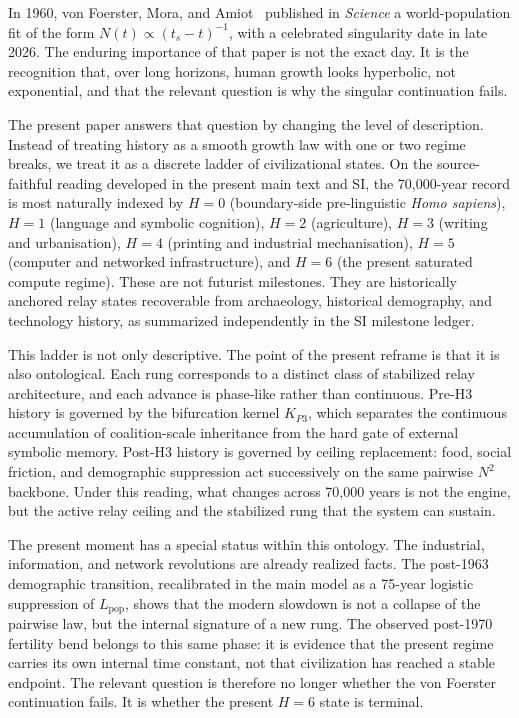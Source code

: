\documentclass[11pt]{article}
\begin{document}
In 1960, von Foerster, Mora, and Amiot~\cite{vonfoerster1960}
published in \textit{Science}
a world-population fit of the form
\(N(t) \propto (t_s-t)^{-1}\),
with a celebrated singularity date in late 2026.
The enduring importance of that paper is not the exact day.
It is the recognition that, over long horizons,
human growth looks hyperbolic,
not exponential,
and that the relevant question is why the singular continuation fails.

The present paper answers that question by changing the level of description.
Instead of treating history as a smooth growth law with one or two regime breaks,
we treat it as a discrete ladder of civilizational states.
On the source-faithful reading developed in the present main text and SI,
the 70,000-year record is most naturally indexed by
\(H=0\) (boundary-side pre-linguistic \emph{Homo sapiens}),
\(H=1\) (language and symbolic cognition),
\(H=2\) (agriculture),
\(H=3\) (writing and urbanisation),
\(H=4\) (printing and industrial mechanisation),
\(H=5\) (computer and networked infrastructure),
and \(H=6\) (the present saturated compute regime).
These are not futurist milestones.
They are historically anchored relay states recoverable from archaeology,
historical demography,
and technology history,
as summarized independently in the SI milestone ledger.

This ladder is not only descriptive.
The point of the present reframe is that it is also ontological.
Each rung corresponds to a distinct class of stabilized relay architecture,
and each advance is phase-like rather than continuous.
Pre-H3 history is governed by the bifurcation kernel
\(K_{P3}\),
which separates the continuous accumulation of coalition-scale inheritance
from the hard gate of external symbolic memory.
Post-H3 history is governed by ceiling replacement:
food,
social friction,
and demographic suppression act successively on the same pairwise
\(N^2\) backbone.
Under this reading,
what changes across 70,000 years is not the engine,
but the active relay ceiling and the stabilized rung that the system can sustain.

The present moment has a special status within this ontology.
The industrial,
information,
and network revolutions are already realized facts.
The post-1963 demographic transition,
recalibrated in the main model as a 75-year logistic suppression of
\(L_{\mathrm{pop}}\),
shows that the modern slowdown is not a collapse of the pairwise law,
but the internal signature of a new rung.
The observed post-1970 fertility bend belongs to this same phase:
it is evidence that the present regime carries its own internal time constant,
not that civilization has reached a stable endpoint.
The relevant question is therefore no longer whether the von Foerster continuation fails.
It is whether the present \(H{=}6\) state is terminal.
\end{document}
